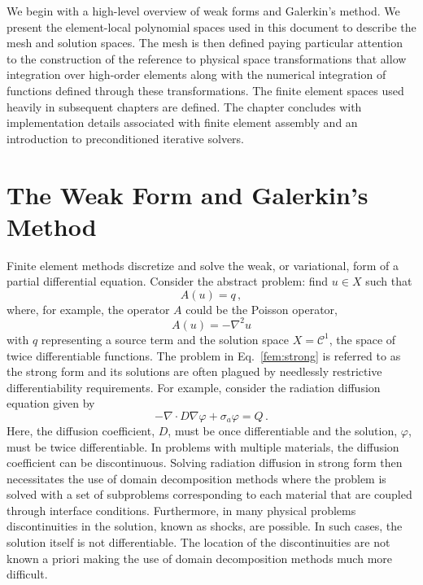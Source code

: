 \documentclass[../doc.tex]{subfiles}
\begin{document}
We begin with a high-level overview of weak forms and Galerkin's method. We present the element-local polynomial spaces used in this document to describe the mesh and solution spaces. The mesh is then defined paying particular attention to the construction of the reference to physical space transformations that allow integration over high-order elements along with the numerical integration of functions defined through these transformations. The finite element spaces used heavily in subsequent chapters are defined. The chapter concludes with implementation details associated with finite element assembly and an introduction to preconditioned iterative solvers. 

\section{The Weak Form and Galerkin's Method}
Finite element methods discretize and solve the weak, or variational, form of a partial differential equation. Consider the abstract problem: find $u \in X$ such that 
	\begin{equation} \label{fem:strong}
		A(u) = q \,,
	\end{equation}
where, for example, the operator $A$ could be the Poisson operator, 
	\begin{equation}
		A(u) = -\nabla^2u
	\end{equation}
with $q$ representing a source term and the solution space $X = \mathcal{C}^1$, the space of twice differentiable functions. The problem in Eq.~\ref{fem:strong} is referred to as the strong form and its solutions are often plagued by needlessly restrictive differentiability requirements. For example, consider the radiation diffusion equation given by
	\begin{equation} \label{fem:rad_strong}
		-\nabla\cdot D \nabla\varphi + \sigma_a \varphi = Q \,. 
	\end{equation}
Here, the diffusion coefficient, $D$, must be once differentiable and the solution, $\varphi$, must be twice differentiable. In problems with multiple materials, the diffusion coefficient can be discontinuous. Solving radiation diffusion in strong form then necessitates the use of domain decomposition methods where the problem is solved with a set of subproblems corresponding to each material that are coupled through interface conditions.  Furthermore, in many physical problems discontinuities in the solution, known as shocks, are possible. In such cases, the solution itself is not differentiable. The location of the discontinuities are not known a priori making the use of domain decomposition methods much more difficult. 
\end{document}
